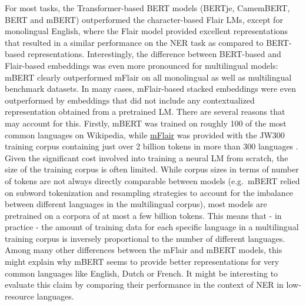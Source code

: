 \documentclass[12pt,a4paper,]{book}
\begin{document}
For most tasks, the Transformer-based BERT models (BERTje, CamemBERT, BERT and mBERT) outperformed the character-based Flair LMs, except for monolingual English, where the Flair model provided excellent representations that resulted in a similar performance on the NER task as compared to BERT-based representations. Interestingly, the difference between BERT-based and Flair-based embeddings was even more pronounced for multilingual models: mBERT clearly outperformed mFlair on all monolingual as well as multilingual benchmark datasets. In many cases, mFlair-based stacked embeddings were even outperformed by embeddings that did not include any contextualized representation obtained from a pretrained LM. There are several reasons that may account for this. Firstly, mBERT was trained on roughly 100 of the most common languages on Wikipedia, while \href{https://github.com/flairNLP/flair/issues/1099}{mFlair} was provided with the JW300 training corpus containing just over 2 billion tokens in more than 300 languages \citep{agic2019}. Given the significant cost involved into training a neural LM from scratch, the size of the training corpus is often limited. While corpus sizes in terms of number of tokens are not always directly comparable between models (e.g.~mBERT relied on subword tokenization and resampling strategies to account for the imbalance between different languages in the multilingual corpus), most models are pretrained on a corpora of at most a few billion tokens. This means that - in practice - the amount of training data for each specific language in a multilingual training corpus is inversely proportional to the number of different languages. Among many other differences between the mFlair and mBERT models, this might explain why mBERT seems to provide better representations for very common languages like English, Dutch or French. It might be interesting to evaluate this claim by comparing their performance in the context of NER in low-resource languages.
\end{document}
